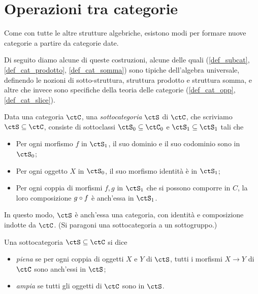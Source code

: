 \section{Operazioni tra categorie}\label{sec_operazioni}
Come con tutte le altre strutture algebriche, esistono modi per formare nuove categorie a partire da categorie date.

Di seguito diamo alcune di queste costruzioni, alcune delle quali (\ref{def_subcat}, \ref{def_cat_prodotto}, \ref{def_cat_somma}) sono tipiche dell'algebra universale, definendo le nozioni di sotto-struttura, struttura prodotto e struttura somma, e altre che invece sono specifiche della teoria delle categorie (\ref{def_cat_opp}, \ref{def_cat_slice}).

\begin{definition}\label{def_subcat}
	Data una categoria \(\ctC\), una \emph{sottocategoria} \(\ctS\) di \(\ctC\), che scriviamo \(\ctS\subseteq \ctC\), consiste di sottoclassi \(\ctS_0\subseteq\ctC_0\) e \(\ctS_1\subseteq\ctS_1\) tali che
	\begin{itemize}
		\item Per ogni morfismo \(f\) in \(\ctS_1\), il suo dominio e il suo codominio sono in \(\ctS_0\);
		\item Per ogni oggetto \(X\) in \(\ctS_0\), il suo morfismo identità è in \(\ctS_1\);
		\item Per ogni coppia di morfismi \(f,g\) in \(\ctS_1\) che si possono comporre in \(C\), la loro composizione \(g\circ f\) è anch'essa in \(\ctS_1\).
	\end{itemize}
	In questo modo, \(\ctS\) è anch'essa una categoria, con identità e composizione indotte da \(\ctC\). (Si paragoni una sottocategoria a un sottogruppo.)

	Una sottocategoria \(\ctS\subseteq \ctC\) si dice
	\begin{itemize}
		\item \emph{piena} se per ogni coppia di oggetti \(X\) e \(Y\) di \(\ctS\), tutti i morfismi \(X\to Y\) di \(\ctC\) sono anch'essi in \(\ctS\);
		\item \emph{ampia} se tutti gli oggetti di \(\ctC\) sono in \(\ctS\).
	\end{itemize}
\end{definition}

